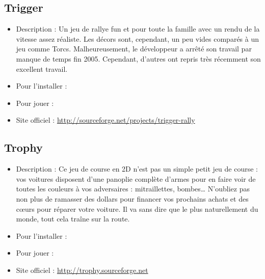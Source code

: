 \subsection{Trigger}
\begin{itemize}
\begingroup
{}
\item Description : Un jeu de rallye fun et pour toute la famille avec un rendu de la vitesse assez réaliste. Les décors sont, cependant, un peu vides comparés à un jeu comme Torcs. Malheureusement, le développeur a arrêté son travail par manque de temps fin 2005. Cependant, d'autres ont repris très récemment son excellent travail.{\par}
\item Pour l'installer : 
\item Pour jouer : 
\item Site officiel : \url{http://sourceforge.net/projects/trigger-rally}{\par}
\endgroup
\end{itemize}
\subsection{Trophy}
\begin{itemize}
\begingroup
{}
\item Description : Ce jeu de course en 2D n'est pas un simple petit jeu de course : vos voitures disposent d'une panoplie complète d'armes pour en faire voir de toutes les couleurs à vos adversaires : mitraillettes, bombes\ldots{} N'oubliez pas non plus de ramasser des dollars pour financer vos prochains achats et des cœurs pour réparer votre voiture. Il va sans dire que le plus naturellement du monde, tout cela traîne sur la route.{\par}
\item Pour l'installer : 
\item Pour jouer : 
\item Site officiel : \url{http://trophy.sourceforge.net}{\par}
\endgroup
\end{itemize}
